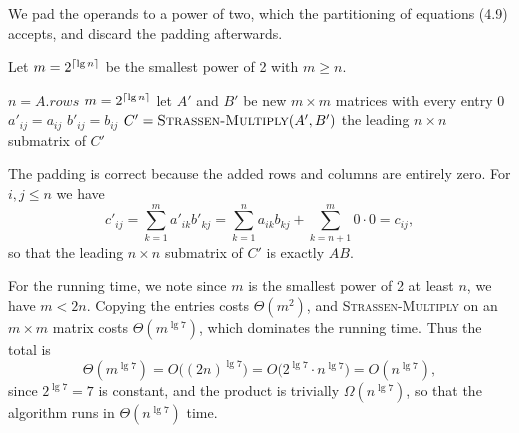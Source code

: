 We pad the operands to a power of two, which the partitioning of 
equations (4.9) accepts, and discard the padding afterwards.

Let $m = 2^{\lceil\lg{n}\rceil}$ be the smallest power of 2 with $m \geq n$.

\begin{algorithmic}[1]
  \STATE $n = A.\mathit{rows}$
  \STATE $m = 2^{\lceil\lg{n}\rceil}$
  \STATE let $A'$ and $B'$ be new $m \times m$ matrices with every entry 0
  \STATE $a'_{ij} = a_{ij}$
  \STATE $b'_{ij} = b_{ij}$
  \ENDFOR
  \ENDFOR
  \STATE $C' = \textsc{Strassen-Multiply}(A', B')$
  \RETURN the leading $n \times n$ submatrix of $C'$
\end{algorithmic}

The padding is correct because the added rows and columns are entirely zero.
For $i, j \leq n$ we have
\[
  c'_{ij} = \sum_{k = 1}^m a'_{ik}b'_{kj}
  = \sum_{k = 1}^n a_{ik}b_{kj} + \sum_{k = n + 1}^m 0 \cdot 0
  = c_{ij},
\]
so that the leading $n \times n$ submatrix of $C'$ is exactly $AB$.

For the running time, we note since $m$ is the smallest power of 2 at least $n$,
we have $m < 2n$. Copying the entries costs $\Theta(m^2)$, and 
\textsc{Strassen-Multiply} on an $m \times m$ matrix costs
$\Theta(m^{\lg{7}})$, which dominates the running time. Thus the total is
\[
  \Theta(m^{\lg{7}}) = O\bigl({(2n)}^{\lg{7}}\bigr)
  = O\bigl(2^{\lg{7}} \cdot n^{\lg{7}}\bigr) = O(n^{\lg{7}}),
\]
since $2^{\lg{7}} = 7$ is constant, and the product is trivially
$\Omega(n^{\lg 7})$, so that the algorithm runs in $\Theta(n^{\lg{7}})$ time.
